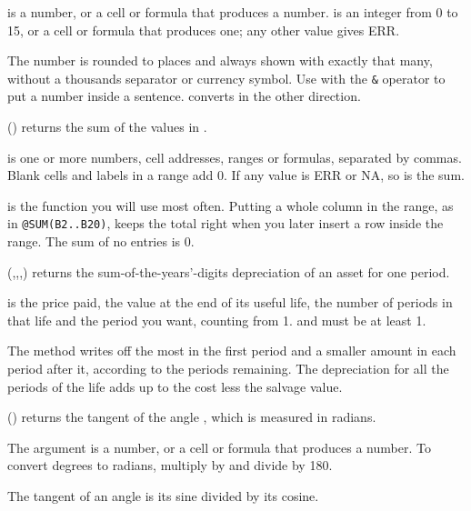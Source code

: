  is a number, or a cell or formula that produces a number.  is an integer from 0 to 15, or a cell or formula that produces one; any other value gives ERR.

The number is rounded to  places and always shown with exactly that many, without a thousands separator or currency symbol. Use  with the \texttt{\&} operator to put a number inside a sentence.  converts in the other direction.

\Examples
{}

() returns the sum of the values in .

 is one or more numbers, cell addresses, ranges or formulas, separated by commas. Blank cells and labels in a range add 0. If any value is ERR or NA, so is the sum.

 is the function you will use most often. Putting a whole column in the range, as in \texttt{@SUM(B2..B20)}, keeps the total right when you later insert a row inside the range. The sum of no entries is 0.

\Examples
{}

(,,,) returns the sum-of-the-years'-digits depreciation of an asset for one period.

 is the price paid,  the value at the end of its useful life,  the number of periods in that life and  the period you want, counting from 1.  and  must be at least 1.

The method writes off the most in the first period and a smaller amount in each period after it, according to the periods remaining. The depreciation for all the periods of the life adds up to the cost less the salvage value.

\Examples
{}

() returns the tangent of the angle , which is measured in radians.

The argument  is a number, or a cell or formula that produces a number. To convert degrees to radians, multiply by  and divide by 180.

The tangent of an angle is its sine divided by its cosine.

\Examples
{}

